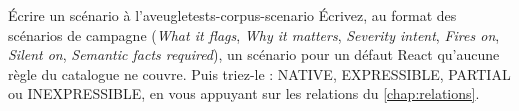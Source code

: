 \begin{exercice}{Écrire un scénario à l'aveugle}{tests-corpus-scenario}
Écrivez, au format des scénarios de campagne (\emph{What it flags}, \emph{Why it matters}, \emph{Severity intent}, \emph{Fires on}, \emph{Silent on}, \emph{Semantic facts required}), un scénario pour un défaut React qu'aucune règle du catalogue ne couvre. Puis triez-le : NATIVE, EXPRESSIBLE, PARTIAL ou INEXPRESSIBLE, en vous appuyant sur les relations du \cref{chap:relations}.
\end{exercice}
